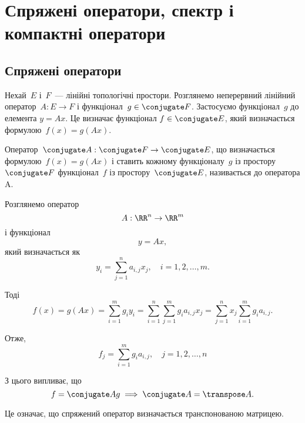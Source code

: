 \chapter{Спряжені оператори, спектр і компактні оператори}

\section{Спряжені оператори}

Нехай~$E$ і~$F$~--- лінійні топологічні простори.
Розглянемо неперервний лінійний оператор~$A: E \to F$ і
функціонал~$g \in \conjugate F$.
Застосуємо функціонал~$g$ до елемента
$y = Ax$. Це визначає функціонал
$f \in \conjugate E$, який
визначається формулою~$f(x) = g(Ax)$.

\begin{definition}
Оператор~$\conjugate A: \conjugate F \to \conjugate E$, що визначається
формулою~$f(x) = g(Ax)$ і ставить кожному
функціоналу~$g$ із простору~$\conjugate F$
функціонал~$f$ із простору~$\conjugate E$,
називається  до оператора A.
\end{definition}

\begin{example}
Розглянемо оператор
\begin{equation*}
    A: \RR^n \to \RR^m
\end{equation*}
і функціонал
\begin{equation*}
    y = Ax,
\end{equation*}
який визначається як
\begin{equation*}
    y_i = \sum_{j = 1}^n a_{i,j} x_j, \quad i = 1, 2, \dots, m.
\end{equation*}

Тоді
\begin{equation*}
    f(x) = g(A x) = \sum_{i = 1}^m g_i y_i =
    \sum_{i = 1}^n \sum_{j = 1}^m g_i a_{i,j} x_j =
    \sum_{j = 1}^n x_j \sum_{i = 1}^m g_i a_{i,j}.
\end{equation*}

Отже,
\begin{equation*}
    f_j = \sum_{i = 1}^m g_i a_{i,j}, \quad j = 1, 2, \dots, n
\end{equation*}

З цього випливає, що
\begin{equation*}
    f = \conjugate A g \implies \conjugate A = \transpose A.
\end{equation*}

Це означає, що спряжений оператор визначається
транспонованою матрицею. 
\end{example}

